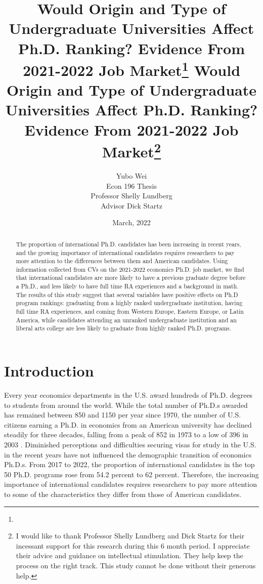 \documentclass[12pt]{article}
\title{ \vspace*{-2.5cm} \hspace*{-0.5cm} Would Origin and Type of Undergraduate Universities Affect Ph.D. Ranking? Evidence From 2021-2022 Job Market\footnote{
}}
\author{Yubo Wei \\ Econ 196 Thesis\\
Professor Shelly Lundberg \\
Advisor Dick Startz}
\date{ \vspace*{0.5cm} March, 2022\\
}
\title{ \vspace*{-2.5cm} \hspace*{-0.5cm}Would Origin and Type of Undergraduate Universities Affect Ph.D. Ranking?\\ Evidence From 2021-2022 Job Market\footnote{
I would like to thank Professor Shelly Lundberg and Dick Startz for their incessant support for this research during this 6 month period. I appreciate their advice and guidance on intellectual stimulation. They help keep the process on the right track. This study cannot be done without their generous help.
}}
\begin{document}
\bgroup
\let\footnoterule\relax

\begin{singlespace}
\maketitle


\begin{abstract}
    \noindent The proportion of international Ph.D. candidates has been increasing in recent years, and the growing importance of international candidates requires researchers to pay more attention to the differences between them and American candidates. Using information collected from CVs on the 2021-2022 economics Ph.D. job market, we find that international candidates are more likely to have a previous graduate degree before a Ph.D., and less likely to have full time RA experiences and a background in math. The results of this study suggest that several variables have positive effects on Ph.D program rankings: graduating from a highly ranked undergraduate institution, having full time RA experiences, and coming from Western Europe, Eastern Europe, or Latin America, while candidates attending an unranked undergraduate institution and an liberal arts college are less likely to graduate from highly ranked Ph.D. programs.
    
\end{abstract}
\end{singlespace}
\thispagestyle{empty}

\clearpage
\egroup
\setcounter{page}{1}


\section{Introduction\label{sec:introduction}}

\noindent Every year economics departments in the U.S. award hundreds of Ph.D. degrees to students from around the world. While the total number of Ph.D.s awarded has remained between 850 and 1150 per year since 1970, the number of U.S. citizens earning a Ph.D. in economics from an American university has declined steadily for three decades, falling from a peak of 852 in 1973 to a low of 396 in 2003 \citep{stock2007}. Diminished perceptions and difficulties securing visas for study in the U.S. in the recent years have not influenced the demographic transition of economics Ph.D.s. From 2017 to 2022, the proportion of international candidates in the top 50 Ph.D. programs rose from 54.2 percent \citep{pathtoeconphd} to 62 percent. Therefore, the increasing importance of international candidates requires researchers to pay more attention to some of the characteristics they differ from those of American candidates.
\end{document}
